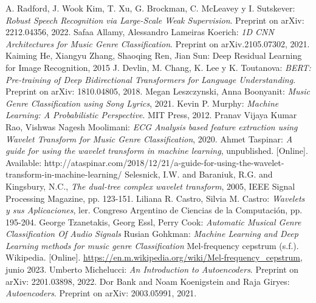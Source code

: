 \documentclass[colorinlistoftodos,twoside,twocolumn,10pt]{article} %
\begin{document}
	    
	\begin{thebibliography}{20}
		 A. Radford, J. Wook Kim, T. Xu, G. Brockman, C. McLeavey y I. Sutskever: \emph{Robust Speech Recognition via Large-Scale Weak Supervision}. Preprint on arXiv: 2212.04356, 2022. 	
		 Safaa Allamy, Alessandro Lameiras Koerich: \emph{1D CNN Architectures for Music Genre Classification}. Preprint on arXiv.2105.07302, 2021. 
		 Kaiming He, Xiangyu Zhang, Shaoqing Ren, Jian Sun: Deep Residual Learning for Image Recognition, 2015
		 J. Devlin, M. Chang, K. Lee y K. Toutanova: \emph{BERT: Pre-training of Deep Bidirectional Transformers for Language Understanding}. Preprint on arXiv: 1810.04805, 2018. 
		 Megan Leszczynski, Anna Boonyanit: \emph{Music Genre Classification using Song Lyrics}, 2021.
		 Kevin P. Murphy: \emph{Machine Learning: A Probabilistic Perspective}. MIT Press, 2012.
		 Pranav Vijaya Kumar Rao, Vishwas Nagesh Moolimani: \emph{ECG Analysis based feature extraction using Wavelet Transform for Music Genre Classification}, 2020. 
		 Ahmet Taspinar: \emph{A guide for using the wavelet transform in machine learning}, unpublished. [Online]. Available: http://ataspinar.com/2018/12/21/a-guide-for-using-the-wavelet-transform-in-machine-learning/
		 Selesnick, I.W. and Baraniuk, R.G. and Kingsbury, N.C., \emph{The dual-tree complex wavelet transform}, 2005, IEEE Signal Processing Magazine, pp. 123-151.
		 Liliana R. Castro, Silvia M.  Castro: \emph{Wavelets y sus Aplicaciones}, ler. Congreso Argentino de Ciencias de la Computaci\'on, pp. 195-204.
		 George Tzanetakis, Georg Essl, Perry Cook: \emph{Automatic Musical Genre Classification Of Audio Signals}
		 Rusian Gohkman: \emph{Machine Learning and Deep Learning methods for music genre Classification}
		 Mel-frequency cepstrum (s.f.). Wikipedia.  [Online]. \url{https://en.m.wikipedia.org/wiki/Mel-frequency_cepstrum}, junio 2023.
		 Umberto Michelucci: \emph{An Introduction to Autoencoders}. Preprint on arXiv: 2201.03898, 2022.
		 Dor Bank and Noam Koenigstein and Raja Giryes: \emph{Autoencoders}. Preprint on arXiv: 2003.05991, 2021.
    \end{thebibliography}
	
\end{document}
